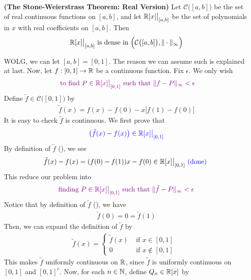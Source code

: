 \documentclass{report}
\begin{document}
\begin{theorem}
\textbf{(The Stone-Weierstrass Theorem: Real Version)} Let $\mathcal{C}\big([a,b] \big)$ be the set of real continuous functions on $[a,b]$, and let $\mathbb{R}[x]\big|_{[a,b]}$ be the set of polynomials in $x$ with real coefficients on $[a,b]$. Then 
\begin{align*}
\text{ $\mathbb{R}[x]\big|_{[a,b]}$ is dense in $\Big(\mathcal{C}\big([a,b] \big),\| \cdot \|_{\infty} \Big)$ }
\end{align*}
\end{theorem}
\begin{proof*}
WOLG, we can let $[a,b]=[0,1]$. The reason we can assume such is explained at last. Now, let $f:[0,1]\rightarrow \mathbb{R}$ be a continuous function. Fix $\epsilon $. We only wish 
\begin{align*}
\textcolor{violet}{\text{ to find $P \in \mathbb{R}[x]\big|_{[0,1]}$ such that $\| f-P \|_{\infty}<\epsilon $}}
\end{align*}
Define $\tilde{f} \in \mathcal{C}\big([0,1] \big)$ by 
\begin{align}
  \label{tse1}
\tilde{f}(x)=f(x)-f(0)-x \big[f(1)-f(0) \big] 
\end{align}
It is easy to check $\tilde{f}$ is continuous. We first prove that 
\begin{align*}
\textcolor{blue}{\big( \tilde{f}(x)-f(x)\big)\in \mathbb{R}[x]\big|_{[0,1]}  }
\end{align*}
By definition of $\tilde{f} $ (), we see 
\begin{align*}
\tilde{f}(x)-f(x)=(f(0)-f(1))x- f(0)\in \mathbb{R}[x]\big|_{[0,1]}\textcolor{blue}{\text{ (done) }}
\end{align*}
This reduce our problem into 
\begin{align*}
\textcolor{violet}{\text{ finding }P\in \mathbb{R}[x]\big|_{[0,1]}\text{ such that $\| \tilde{f}-P \|_{\infty}<\epsilon $ }}
\end{align*}
Notice that by definition of $\tilde{f}$ (), we have 
\begin{align*}
\tilde{f}(0)=0=\tilde{f}(1) 
\end{align*}
Then, we can expand the definition of $\tilde{f} $  by
\begin{align}
\label{tse2}  
\tilde{f}(x)=\begin{cases}
  \tilde{f} (x)& \text{ if $x\in [0,1]$ }\\
  0& \text{ if $x \not \in [0,1]$ }
\end{cases}
\end{align}
This makes $\tilde{f}$ uniformly continuous on $\mathbb{R}$, since  $\tilde{f}$ is uniformly continuous on $[0,1]$ and $[0,1]^c$. Now, for each $n\in\mathbb{N}$, define $Q_n \in \mathbb{R}[x]$ by 

\end{proof*}
\end{document}
